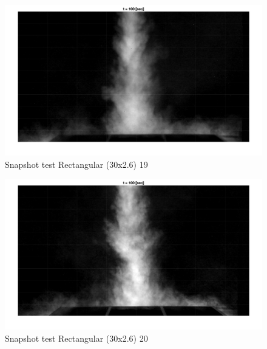 \begin{figure}[ht!]
    \centering
    \includegraphics[width=\linewidth]{Images/Rec30_19_t100.jpg}
    \caption{Snapshot test Rectangular (30x2.6) 19}
\end{figure}

\begin{figure}[ht!]
    \centering
    \includegraphics[width=\linewidth]{Images/Rec30_20_t100.jpg}
    \caption{Snapshot test Rectangular (30x2.6) 20}
\end{figure}



